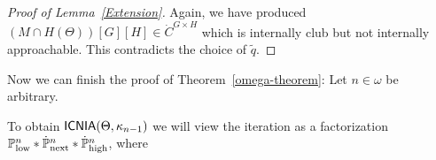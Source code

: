 \documentclass[a4paper]{amsart}
\theoremstyle{definition}
\theoremstyle{remark}
\theoremstyle{plain}
\newtheorem{mylem}[mydef]{Lemma}
\numberwithin{mydef}{section}
\DeclareMathOperator{\ICNIA}{\textup{\textsf{ICNIA}}}
\newcommand{\dI}{\mathbb{I}}
\newcommand{\dM}{\mathbb{M}}
\newcommand{\dP}{\mathbb{P}}
\begin{document}
\begin{proof}[Proof of Lemma~\ref{Extension}]
		Again, we have produced $(M \cap H(\Theta))[G][H]\in\dot{C}^{G \times H}$ which is internally club but not internally approachable. This contradicts the choice of $\tilde{q}$.\end{proof}
	

	
%	
	

Now we can finish the proof of Theorem~\autoref{omega-theorem}: Let $n\in\omega$ be arbitrary.


	
	
		To obtain $\ICNIA(\Theta,\kappa_{n-1})$ we will view the iteration as a factorization $\dP_\textup{low}^n\ast \dot{\dP}_\textup{next}^n \ast \dot{\dP}_\textup{high}^n$, where
	
	
\end{document}
